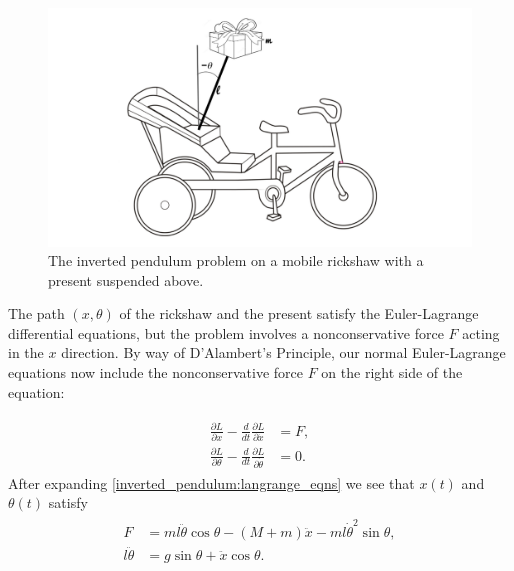 \begin{figure}
\centering
\includegraphics[width=\textwidth]{figures/rickshaw_img.png}
\caption{The inverted pendulum problem on a mobile rickshaw with a present suspended above.
}
\label{fig:inverted_pendulum:rickshaw_diagram}
\end{figure}

The path $(x,\theta)$ of the rickshaw and the present satisfy the Euler-Lagrange differential equations, but the problem involves a nonconservative force $F$ acting in the $x$ direction.
By way of D'Alambert's Principle, our normal Euler-Lagrange equations now include the nonconservative force $F$ on the right side of the equation:

\begin{align}
	\begin{split}
\frac{\partial L}{\partial x} - \frac{d}{dt} \frac{\partial L}{\partial \dot{x}} &= F,\\
\frac{\partial L}{\partial \theta} - \frac{d}{dt} \frac{\partial L}{\partial \dot{\theta}} &= 0.
	\end{split}\label{inverted_pendulum:langrange_eqns}
\end{align}
After expanding \eqref{inverted_pendulum:langrange_eqns} we see that $x(t)$ and $\theta(t)$ satisfy
\begin{align}
	\begin{split}
		F &= ml\ddot{\theta} \cos \theta - (M + m)\ddot{x} - ml \dot{\theta}^2 \sin \theta,\\
		l \ddot{\theta} &= g \sin \theta + \ddot{x} \cos \theta.
	\end{split}\label{inverted_pendulum:langrange_eqns_explicit}
\end{align}

